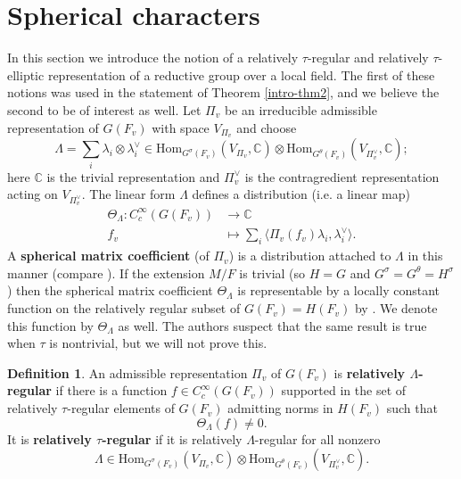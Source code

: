 \documentclass[12pt]{amsart}
\theoremstyle{remark}
\numberwithin{equation}{section}
\newcommand{\lto}{\longrightarrow}
\newcommand{\CC}{\mathbb{C}}
\theoremstyle{definition}
\newtheorem{defn}[thm]{Definition}
\numberwithin{equation}{subsection}
\begin{document}
\section{Spherical characters} \label{sec-sph}
In this section we introduce the notion of a relatively $\tau$-regular and relatively $\tau$-elliptic representation of a reductive group over a local field.  The first of these notions was used in the statement of Theorem \ref{intro-thm2}, and we believe the second to be of interest as well.
 Let $\Pi_v$ be an irreducible admissible representation of $G(F_v)$ with space $V_{\Pi_v}$ and choose
$$
\Lambda=\sum_i \lambda_i \otimes \lambda^{\vee}_i \in \mathrm{Hom}_{G^{\sigma}(F_v)}(V_{\Pi_v},\CC) \otimes\mathrm{Hom}_{G^{\theta}(F_v)}(V_{\Pi_v^{\vee}},\CC);
$$\index{$\Lambda$}here $\CC$ is the trivial representation and $\Pi_v^{\vee}$ is the contragredient representation acting on $V_{\Pi_v^{\vee}}$.
The linear form $\Lambda$ defines a distribution (i.e. a linear map)
\begin{align}
\Theta_{\Lambda}:C_c^{\infty}(G(F_v)) &\lto \CC\\
\nonumber f_v &\longmapsto \sum_i\langle \Pi_v(f_v)\lambda_i, \lambda^{\vee}_i\rangle.
\end{align}\index{$\Theta_{\Lambda}$}A \textbf{spherical matrix coefficient} (of $\Pi_v$) is a distribution attached to $\Lambda$ in this manner (compare \cite{HakimSCHP}).  If the extension $M/F$ is trivial (so $H=G$ and $G^{\sigma}=G^{\theta}=H^{\sigma}$) then the spherical matrix coefficient $\Theta_{\Lambda}$ is representable by a locally constant function on
the relatively regular subset of $G(F_v)=H(F_v)$ by \cite[Lemma 6]{HakimSCHP}.  We denote this function by $\Theta_{\Lambda}$ as well.  The authors suspect that the same result is true when $\tau$ is nontrivial, but we will not prove this.

\begin{defn}
An admissible representation $\Pi_v$ of $G(F_v)$ is \textbf{relatively $\Lambda$-regular} if there is a function $f \in C_c^{\infty}(G(F_v))$ supported in the set of relatively $\tau$-regular elements of $G(F_v)$ admitting norms in $H(F_v)$ such that
$$
\Theta_{\Lambda}(f) \neq 0.
$$
  It is \textbf{relatively $\tau$-regular} if it is relatively $\Lambda$-regular for all nonzero
$$
 \Lambda \in  \mathrm{Hom}_{G^{\sigma}(F_v)}(V_{\Pi_v},\CC) \otimes \mathrm{Hom}_{G^{\theta}(F_v)}(V_{\Pi_v^{\vee}},\CC).
$$
\end{defn}
\end{document}
